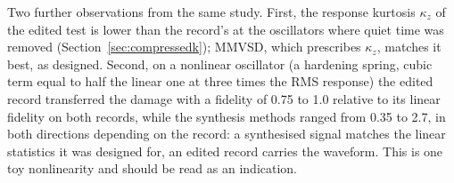 Two further observations from the same study. First, the response kurtosis $\kappa_z$ of the edited
test is lower than the record's at the oscillators where quiet time was removed (Section~\ref{sec:compressedk});
MMVSD, which prescribes $\kappa_z$, matches it best, as designed. Second, on a nonlinear oscillator
(a hardening spring, cubic term equal to half the linear one at three times the RMS response) the
edited record transferred the damage with a fidelity of 0.75 to 1.0 relative to its linear fidelity on
both records, while the synthesis methods ranged from 0.35 to 2.7, in both directions depending on the
record: a synthesised signal matches the linear statistics it was designed for, an edited record
carries the waveform. This is one toy nonlinearity and should be read as an indication.
